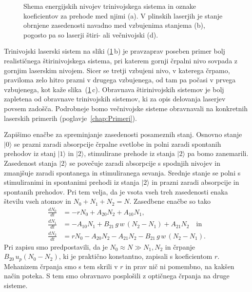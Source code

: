 \begin{figure}[h]
\centering
\def\svgwidth{130truemm} 

\caption{Shema energijskih nivojev trinivojskega sistema in oznake koeficientov za prehode
med njimi (a). V plinskih laserjih je stanje obrnjene zasedenosti navadno med vzbujenima 
stanjema (b), pogosto pa so laserji štiri- ali večnivojski (d).}
\label{fig:3nivojski}
\end{figure}
\begin{remark}
Trinivojski laserski sistem na sliki (\ref{fig:3nivojski}\,b) je pravzaprav 
poseben primer bolj realističnega štiri\-nivojskega sistema, 
pri katerem gornji črpalni nivo sovpada z gornjim laserskim nivojem. Sicer se tretji vzbujeni nivo, 
v katerega črpamo, praviloma zelo hitro prazni v drugega vzbujenega, od tam pa počasi v prvega vzbujenega, 
kot kaže slika~(\ref{fig:3nivojski}\,c).
Obravnava štirinivojskih sistemov je bolj zapletena od obravnave trinivojskih sistemov, 
ki za opis delovanja laserjev povsem zadošča. Podrobneje bomo večnivojske sisteme 
obravnavali na konkretnih laserskih primerih (poglavje~\ref{chap:Primeri}).
\end{remark}

Zapišimo enačbe za spreminjanje zasedenosti posameznih stanj. Osnovno stanje
$|0\rangle$ se prazni zaradi absorpcije črpalne svetlobe in polni zaradi
spontanih prehodov iz stanj $|1\rangle$ in $|2\rangle$, stimulirane
prehode iz stanja $|2\rangle$ pa bomo zanemarili. Zasedenost stanja $|2\rangle$ se
povečuje zaradi absorpcije s spodnjih nivojev in zmanjšuje
zaradi spontanega in stimuliranega sevanja. Srednje stanje se polni
s stimuliranimi in spontanimi prehodi iz stanja $|2\rangle$ in prazni
zaradi absorpcije in spontanih prehodov.
Pri tem velja, da je vsota vseh treh zasedenosti enaka številu vseh atomov in $N_{0}+N_{1}+N_{2}=N$. 
Zasedbene enačbe so tako
\begin{align}
\frac{dN_{0}}{dt} & =  -rN_0+A_{20}N_{2}+A_{10}N_{1}, \label{4.39.1}\\
\frac{dN_{1}}{dt} & =  -A_{10}N_{1}+B_{21}\,g\,w\, (N_{2}-N_{1})+A_{21}N_{2} \label{4.39.2} \quad \mathrm{in}\\
\frac{dN_{2}}{dt} & =  rN_0-A_{20}N_{2}-A_{21}N_{2}-B_{21}\,g\,w\, (N_2-N_1).
\label{4.39}
\end{align}
Pri zapisu smo predpostavili, da je $N_0 \approx N \gg N_1, N_2$ in črpanje $B_{20}\, 
u_{p} (N_0-N_2)$, ki je praktično konstantno, zapisali s koeficientom $r$. Mehanizem črpanja 
smo s tem skrili v $r$ in prav nič ni pomembno, na kakšen način poteka.
S tem smo obravnavo posplošili z optičnega črpanja na druge sisteme. 

